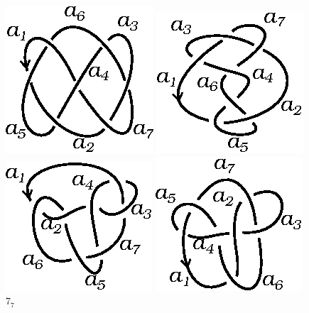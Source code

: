 \documentclass[graybox]{svmult}
\begin{document}
\begin{figure}[ht]
		\centering
		\begin{minipage}{0.4\textwidth}
			\centering
	    	\includegraphics[scale=0.6]{images/7_4}
			\caption{$7_4$}
			\label{fig:7_4}
		\end{minipage}
		\begin{minipage}{0.4\textwidth}
			\centering
	    	\includegraphics[scale=0.6]{images/7_5}
			\caption{$7_5$}
			\label{fig:7_5}
		\end{minipage}
		\begin{minipage}{0.4\textwidth}
			\centering
	    	\includegraphics[scale=0.6]{images/7_6}
			\caption{$7_6$}
			\label{fig:7_6}
		\end{minipage}
		\begin{minipage}{0.4\textwidth}
			\centering
	    	\includegraphics[scale=0.6]{images/7_7}
			\caption{$7_7$}
			\label{fig:7_7}
		\end{minipage}
	\end{figure}
\end{document}
